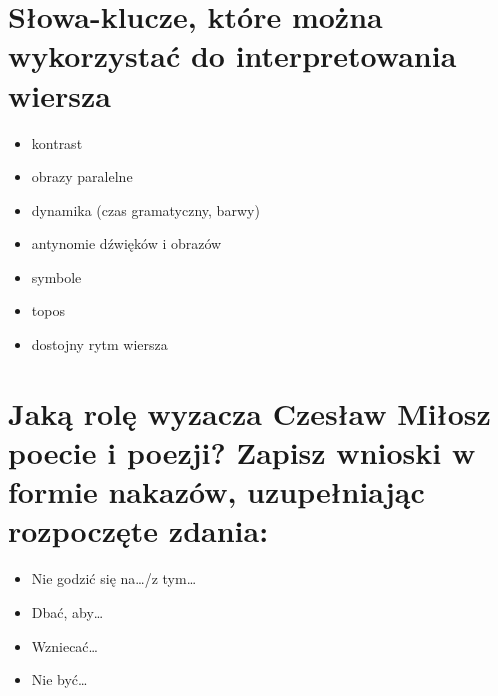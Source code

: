 \documentclass[a4paper]{article}
\begin{document}
\section{Słowa-klucze, które można wykorzystać do interpretowania wiersza}
\begin{itemize}
    \item kontrast
    \item obrazy paralelne
    \item dynamika (czas gramatyczny, barwy)
    \item antynomie dźwięków i obrazów
    \item symbole
    \item topos
    \item dostojny rytm wiersza
\end{itemize}
\section{Jaką rolę wyzacza Czesław Miłosz poecie i po\-ezji? Zapisz wnioski w formie nakazów, uzupełniając rozpoczęte zdania:}
\begin{itemize}
    \item Nie godzić się na\dots/z tym\dots
    \item Dbać, aby\dots
    \item Wzniecać\dots
    \item Nie być\dots
\end{itemize}
\end{document}
